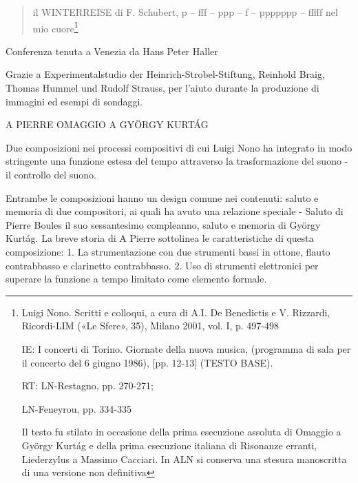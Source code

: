 \begin{quote}
il WINTERREISE di F. Schubert, p – fff – ppp – f – ppppppp – fffff nel mio cuore\footnote{Luigi Nono. Scritti e colloqui, a cura di A.I. De Benedictis e V. Rizzardi, Ricordi-LIM («Le Sfere», 35), Milano 2001, vol. I, p. 497-498

IE: I concerti di Torino. Giornate della nuova musica, (programma di sala per il concerto del 6 giugno 1986), [pp. 12-13] (TESTO BASE).

RT: LN-Restagno, pp. 270-271;

LN-Feneyrou, pp. 334-335

Il testo fu stilato in occasione della prima esecuzione assoluta di Omaggio a György Kurtág e della prima esecuzione italiana di Risonanze erranti, Liederzylus a Massimo Cacciari. In ALN si conserva una stesura manoscritta di una versione non definitiva}

\end{quote}

%

Conferenza tenuta a Venezia da Hans Peter Haller

Grazie a Experimentalstudio der Heinrich-Strobel-Stiftung, Reinhold Braig, Thomas Hummel und Rudolf Strauss, per l'aiuto durante la produzione di immagini ed esempi di sondaggi.


A PIERRE
OMAGGIO A GYÖRGY KURTÁG

Due composizioni nei processi compositivi di cui Luigi Nono ha integrato in modo stringente una funzione estesa del tempo attraverso la trasformazione del suono - il controllo del suono.

Entrambe le composizioni hanno un design comune nei contenuti: saluto e memoria di due compositori, ai quali ha avuto una relazione speciale - Saluto di Pierre Boules il suo sessantesimo compleanno, saluto e memoria di György Kurtág.
La breve storia di A Pierre sottolinea le caratteristiche di questa composizione:
1. La strumentazione con due strumenti bassi in ottone, flauto contrabbasso e clarinetto contrabbasso.
2. Uso di strumenti elettronici per superare la funzione a tempo limitato come elemento formale.

